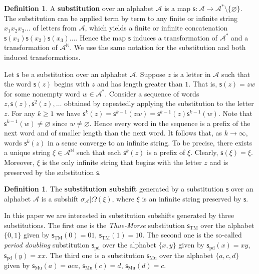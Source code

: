\documentclass[12pt]{article}
\theoremstyle{definition}
\newtheorem{definition}[theorem]{Definition}
\def\bN{\mathbb{N}}
\def\cA{\mathcal{A}}
\def\si{\sigma}
\def\subst{\mathsf{s}}
\def\TM{\subst_{\mathrm{TM}}}
\def\pd{\subst_{\mathrm{pd}}}
\def\sub{\subst_{\mathrm{Mu}}}
\begin{document}
\begin{definition}\label{def-sub}
A \textbf{substitution} over an alphabet $\cA$ is a map 
$\mathsf{s}:\cA\to\cA^*\setminus\{\varnothing\}$.  The substitution can be 
applied term by term to any finite or infinite string $x_1x_2x_3\ldots$ of 
letters from $\cA$, which yields a finite or infinite concatenation 
$\mathsf{s}(x_1)\mathsf{s}(x_2)\mathsf{s}(x_3)\ldots$.  Hence the map 
$\mathsf{s}$ induces a transformation of $\cA^*$ and a transformation of 
$\cA^{\bN}$.  We use the same notation for the substitution and both 
induced transformations.
\end{definition}

Let $\mathsf{s}$ be a substitution over an alphabet $\cA$.  Suppose $z$ is 
a letter in $\cA$ such that the word $\mathsf{s}(z)$ begins with $z$ and 
has length greater than $1$.  That is, $\mathsf{s}(z)=zw$ for some nonempty 
word $w\in\cA^*$.  Consider a sequence of words 
$z,\mathsf{s}(z),\mathsf{s}^2(z),\dots$ obtained by repeatedly applying the 
substitution to the letter $z$.  For any $k\ge1$ we have $\mathsf{s}^k(z)= 
\mathsf{s}^{k-1}(zw)=\mathsf{s}^{k-1}(z)\mathsf{s}^{k-1}(w)$.  Note that 
$\mathsf{s}^{k-1}(w)\ne\varnothing$ since $w\ne\varnothing$.  Hence every 
word in the sequence is a prefix of the next word and of smaller length 
than the next word.  It follows that, as $k\to\infty$, words 
$\mathsf{s}^k(z)$ in a sense converge to an infinite string.  To be 
precise, there exists a unique string $\xi\in\cA^{\bN}$ such that each 
$\mathsf{s}^k(z)$ is a prefix of $\xi$.  Clearly, $\mathsf{s}(\xi)=\xi$.  
Moreover, $\xi$ is the only infinite string that begins with the letter $z$ 
and is preserved by the substitution $\mathsf{s}$.

\begin{definition}\label{def-subshift}
The \textbf{substitution subshift} generated by a substitution $\mathsf{s}$ 
over an alphabet $\cA$ is a subshift $\si_{\cA}|\Omega(\xi)$, where $\xi$ 
is an infinite string preserved by $\mathsf{s}$.
\end{definition}

In this paper we are interested in substitution subshifts generated by 
three substitutions.  The first one is the \emph{Thue-Morse} substitution 
$\TM$ over the alphabet $\{0,1\}$ given by $\TM(0)=01$, $\TM(1)=10$.  The 
second one is the so-called \emph{period doubling} substitution $\pd$ over 
the alphabet $\{x,y\}$ given by $\pd(x)=xy$, $\pd(y)=xx$.  The third one is 
a substitution $\sub$ over the alphabet $\{a,c,d\}$ given by $\sub(a)=aca$, 
$\sub(c)=d$, $\sub(d)=c$.
\end{document}

